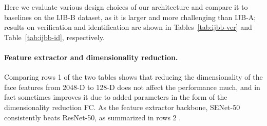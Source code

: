 \documentclass[runningheads]{llncs}
\begin{document}
Here we evaluate various design choices of our architecture
and compare it to baselines on the IJB-B dataset,
as it is larger and more challenging than IJB-A;
results on verification and identification are shown in
Tables~\ref{tab:ijbb-ver} and Table~\ref{tab:ijbb-id},
respectively.

\paragraph{Feature extractor and dimensionality reduction.}
Comparing rows 1  of the two tables shows
that reducing the dimensionality of the face features
from 2048-D to 128-D does not affect the performance much,
and in fact sometimes improves it due to added parameters
in the form of the dimensionality reduction FC.
As the feature extractor backbone,
SENet-50 consistently beats ResNet-50, 
as summarized in rows 2 .

\newcommand\rownumber{\stepcounter{magicrownumbers}
\arabic{magicrownumbers}}
\end{document}
